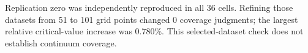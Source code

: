 Replication zero was independently reproduced in all 36 cells. Refining those datasets from 51 to 101 grid points changed 0 coverage judgments; the largest relative critical-value increase was 0.780\%. This selected-dataset check does not establish continuum coverage.
